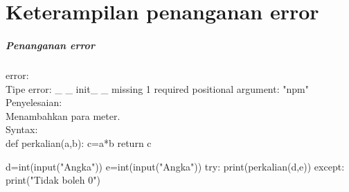 \documentclass[a4paper,12pt]{report}
\begin{document}
\chapter*{Keterampilan penanganan error}
\paragraph{Penanganan error}
error:\\
Tipe error: \_ \_ init\_ \_ missing 1 required positional argument: "npm"\\
Penyelesaian:\\
Menambahkan para meter.\\

Syntax:\\
def perkalian(a,b):
	c=a*b
	return c
	
d=int(input("Angka"))
e=int(input("Angka"))
try:
	print(perkalian(d,e))
except:
	print("Tidak boleh 0")		
\end{document}
